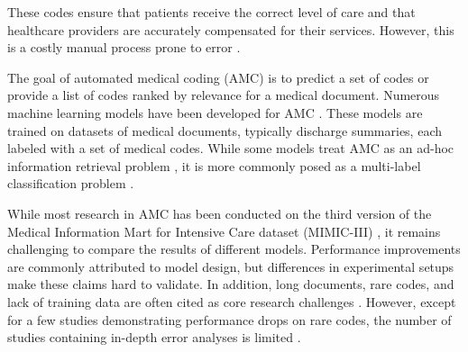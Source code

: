 {These codes ensure that patients receive the correct level of care and that healthcare providers are accurately compensated for their services. However, this is a costly manual process prone to error \cite{tsengAdministrativeCostsAssociated2018, omalleyMeasuringDiagnosesICD2005, burnsSystematicReviewDischarge2012}.

The goal of automated medical coding (AMC) is to predict a set of codes or provide a list of codes ranked by relevance for a medical document. Numerous machine learning models have been developed for AMC \cite{jiUnifiedReviewDeep2022, tengReviewDeepNeural2022, stanfillSystematicLiteratureReview2010}. These models are trained on datasets of medical documents, typically discharge summaries, each labeled with a set of medical codes.
While some models treat AMC as an ad-hoc information retrieval problem \cite{rizzoICDCodeRetrieval2015,parkInformationRetrievalApproach2019}, it is more commonly posed as a multi-label classification problem \cite{tengReviewDeepNeural2022, jiUnifiedReviewDeep2022}.

While most research in AMC has been conducted on the third version of the Medical Information Mart for Intensive Care dataset (MIMIC-III) \cite{tengReviewDeepNeural2022, venkateshAutomatingOverburdenedClinical2023}, it remains challenging to compare the results of different models. Performance improvements are commonly attributed to model design, but differences in experimental setups make these claims hard to validate.
In addition, long documents, rare codes, and lack of training data are often cited as core research challenges \cite{baoMedicalCodePrediction2021,dongAutomatedClinicalCoding2022,dongExplainableAutomatedCoding2021,feuchtDescriptionbasedLabelAttention2021,gaoLimitationsTransformersClinical2021,huangPLMICDAutomaticICD2022,jiDoesMagicBERT2021,jiUnifiedReviewDeep2022,kavuluruEmpiricalEvaluationSupervised2015,kimReadAttendCode2021,liICDCodingClinical2020,liuEffectiveConvolutionalAttention2021,michalopoulosICDBigBirdContextualEmbedding2022,moonsComparisonDeepLearning2020,pascualBERTbasedAutomaticICD2021,tengReviewDeepNeural2022,tengExplainablePredictionMedical2020,xieEHRCodingMultiscale2019,yangKnowledgeInjectedPrompt2022,zhangBERTXMLLargeScale2020,zhouAutomaticICDCoding2021, vuLabelAttentionModel2020, venkateshAutomatingOverburdenedClinical2023}. However, except for a few studies demonstrating performance drops on rare codes, the number of studies containing in-depth error analyses is limited \cite{baoMedicalCodePrediction2021,dongExplainableAutomatedCoding2021,jiDoesMagicBERT2021}.

}
